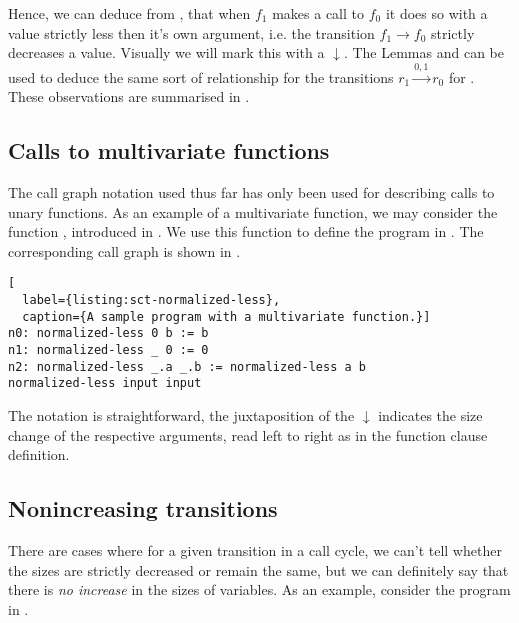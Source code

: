Hence, we can deduce from , that when $f_1$ makes a
call to $f_0$ it does so with a value strictly less then it's own argument,
i.e. the transition $f_1\rightarrow f_0$ strictly decreases a value. Visually
we will mark this with a $\downarrow$. The Lemmas 
and  can be used to deduce the same sort of
relationship for the transitions $r_1\xrightarrow{0,1} r_0$ for
. These observations are summarised in
.



\subsection{Calls to multivariate functions}

The call graph notation used thus far has only been used for describing calls
to unary functions. As an example of a multivariate function, we may consider
the function , introduced in
. We use this function to define the program in
. The corresponding call graph is shown in
.

\begin{lstlisting}[
  label={listing:sct-normalized-less},
  caption={A sample program with a multivariate function.}]
n0: normalized-less 0 b := b
n1: normalized-less _ 0 := 0
n2: normalized-less _.a _.b := normalized-less a b
normalized-less input input
\end{lstlisting}



The notation is straightforward, the juxtaposition of the $\downarrow$
indicates the size change of the respective arguments, read left to right as in
the function clause definition.

\subsection{Nonincreasing transitions}

There are cases where for a given transition in a call cycle, we can't tell
whether the sizes are strictly decreased or remain the same, but we can
definitely say that there is \emph{no increase} in the sizes of variables. As
an example, consider the program in .

